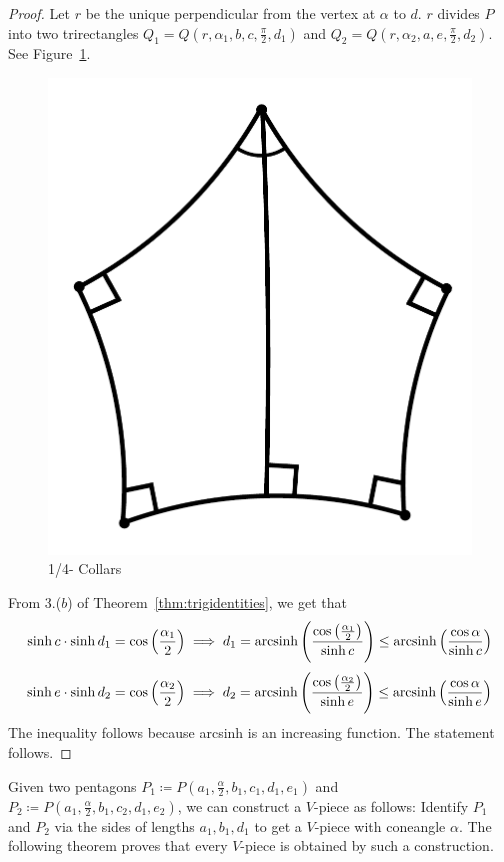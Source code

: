 \begin{proof}
	
	Let $r$ be the unique perpendicular from the vertex at $\alpha$ to $d$. $r$ divides $P$ into two trirectangles $Q_1 =  Q(r,\alpha_1, b,c,\frac{\pi}{2},d_1)$ and $ Q_2 = Q(r,\alpha_2, a,e,\frac{\pi}{2},d_2)$. See Figure~\ref{fig:pent}.
	
	\begin{figure}[h] 
		\centering
		\includegraphics[width=0.3\linewidth]{Appendix1/quartercollar.pdf}
		\caption{1/4- Collars}
		\label{fig:pent}
	\end{figure}
	
	\noindent
	From 3.($b$) of Theorem~\ref{thm:trigidentities}, we get that
	$$ \sinh{c} \cdot \sinh{d_1} =  \cos{\left(\frac{\alpha_1}{2}\right)} \implies d_1 = \textup{arcsinh}\left(\frac{\cos\left(\frac{\alpha_1}{2} \right)}{\sinh{c}}\right) \leq \textup{arcsinh}\left(\frac{\cos{\alpha} }{\sinh{c}}\right)$$
	$$ \sinh{e} \cdot \sinh{d_2} =  \cos{\left(\frac{\alpha_2}{2}\right)} \implies d_2 = \textup{arcsinh}\left(\frac{\cos\left(\frac{\alpha_2}{2} \right)}{\sinh{e}}\right) \leq \textup{arcsinh}\left(\frac{\cos{\alpha}}{\sinh{e}}\right)$$
	The inequality follows because arcsinh is an increasing function. The statement follows. 
\end{proof}



Given two pentagons $P_1 \coloneqq P(a_1,\frac{\alpha}{2},b_1,c_1,d_1,e_1)$ and $ P_2 \coloneqq P(a_1,\frac{\alpha}{2},b_1,c_2,d_1,e_2)$, we can construct a $V$-piece as follows: Identify $P_1$ and $P_2$ via the sides of lengths $a_1, b_1, d_1$ to get a $V$-piece with coneangle $\alpha$. The following theorem proves that every $V$-piece is obtained by such a construction.

